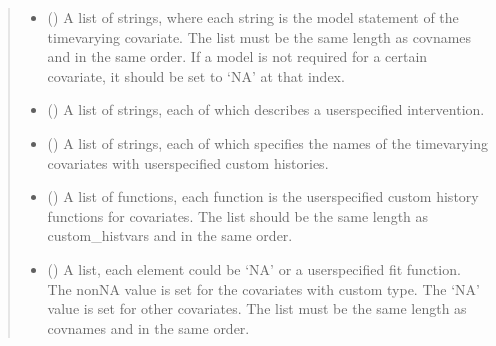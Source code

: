 \documentclass[letterpaper,10pt,english]{sphinxmanual}
\begin{document}
\begin{fulllineitems}
\begin{quote}
\begin{description}
\begin{itemize}
\item {} 
\sphinxAtStartPar
{} (\sphinxstyleliteralemphasis{\sphinxupquote{, }}) \textendash{} A list of strings, where each string is the model statement of the time\sphinxhyphen{}varying covariate. The list
must be the same length as covnames and in the same order. If a model is not required for a certain covariate,
it should be set to ‘NA’ at that index.

\item {} 
\sphinxAtStartPar
{} (\sphinxstyleliteralemphasis{\sphinxupquote{, }}) \textendash{} A list of strings, each of which describes a user\sphinxhyphen{}specified intervention.

\item {} 
\sphinxAtStartPar
{} (\sphinxstyleliteralemphasis{\sphinxupquote{, }}) \textendash{} A list of strings, each of which specifies the names of the time\sphinxhyphen{}varying covariates with user\sphinxhyphen{}specified custom histories.

\item {} 
\sphinxAtStartPar
{} (\sphinxstyleliteralemphasis{\sphinxupquote{, }}) \textendash{} A list of functions, each function is the user\sphinxhyphen{}specified custom history functions for covariates. The list
should be the same length as custom\_histvars and in the same order.

\item {} 
\sphinxAtStartPar
{} (\sphinxstyleliteralemphasis{\sphinxupquote{, }}) \textendash{} A list, each element could be ‘NA’ or a user\sphinxhyphen{}specified fit function. The non\sphinxhyphen{}NA value is set
for the covariates with custom type. The ‘NA’ value is set for other covariates. The list must be the
same length as covnames and in the same order.


\end{itemize}
\end{description}
\end{quote}
\end{fulllineitems}
\end{document}
